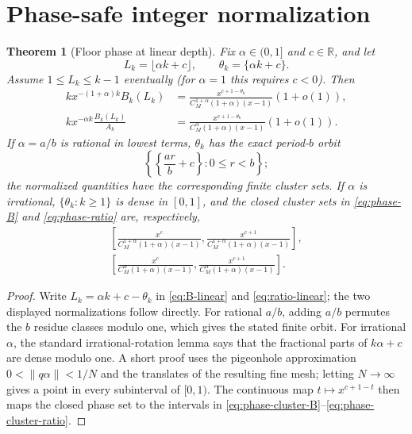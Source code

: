 \documentclass[11pt]{article}
\newtheorem{theorem}{Theorem}[section]
\theoremstyle{remark}
\begin{document}
\section{Phase-safe integer normalization}

\begin{theorem}[Floor phase at linear depth]\label{thm:phase}
Fix $\alpha\in(0,1]$ and $c\in\mathbb R$, and let
\[
 L_k=\lfloor\alpha k+c\rfloor,
 \qquad \theta_k=\{\alpha k+c\}.
\]
Assume $1\le L_k\le k-1$ eventually (for $\alpha=1$ this requires $c<0$).
Then
\begin{align}
 kx^{-(1+\alpha)k}B_k(L_k)
 &=\frac{x^{c+1-\theta_k}}
 {C_M^{1+\alpha}(1+\alpha)(x-1)}(1+o(1)),\label{eq:phase-B}\\
 kx^{-\alpha k}\frac{B_k(L_k)}{A_k}
 &=\frac{x^{c+1-\theta_k}}
 {C_M^{\alpha}(1+\alpha)(x-1)}(1+o(1)).\label{eq:phase-ratio}
\end{align}
If $\alpha=a/b$ is rational in lowest terms, $\theta_k$ has the exact
period-$b$ orbit
\[
 \left\{\left\{\frac{ar}{b}+c\right\}:0\le r<b\right\};
\]
the normalized quantities have the corresponding finite cluster sets.  If
$\alpha$ is irrational, $\{\theta_k:k\ge1\}$ is dense in $[0,1]$, and the
closed cluster sets in \eqref{eq:phase-B} and \eqref{eq:phase-ratio} are,
respectively,
\begin{align}
 \left[\frac{x^c}{C_M^{1+\alpha}(1+\alpha)(x-1)},
       \frac{x^{c+1}}{C_M^{1+\alpha}(1+\alpha)(x-1)}\right],\label{eq:phase-cluster-B}\\
 \left[\frac{x^c}{C_M^{\alpha}(1+\alpha)(x-1)},
       \frac{x^{c+1}}{C_M^{\alpha}(1+\alpha)(x-1)}\right].\label{eq:phase-cluster-ratio}
\end{align}
\end{theorem}

\begin{proof}
Write $L_k=\alpha k+c-\theta_k$ in \eqref{eq:B-linear} and
\eqref{eq:ratio-linear}; the two displayed normalizations follow directly.
For rational $a/b$, adding $a/b$ permutes the $b$ residue classes modulo one,
which gives the stated finite orbit.  For irrational $\alpha$, the standard
irrational-rotation lemma says that the fractional parts of
$k\alpha+c$ are dense modulo one.  A short proof uses the pigeonhole
approximation $0<\|q\alpha\|<1/N$ and the translates of the resulting fine
mesh; letting $N\to\infty$ gives a point in every subinterval of $[0,1)$.
The continuous map $t\mapsto x^{c+1-t}$ then maps the closed phase set to the
intervals in \eqref{eq:phase-cluster-B}--\eqref{eq:phase-cluster-ratio}.
\end{proof}
\end{document}
